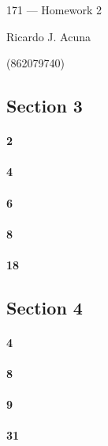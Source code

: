 \documentclass{article}
\begin{document}
\begin{center}
  171 --- Homework 2

  Ricardo J. Acuna

  (862079740)
\end{center}\vspace{1.618em}

\subsection*{Section 3}

\paragraph{2}

\paragraph{4}

\paragraph{6}

\paragraph{8}

\paragraph{18}

\subsection*{Section 4}

\paragraph{4}

\paragraph{8}

\paragraph{9}

\paragraph{31}
\end{document}
